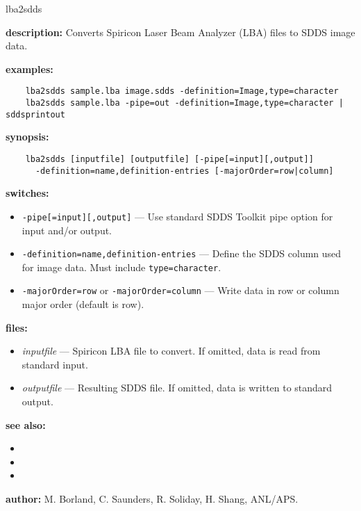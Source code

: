 \begin{sddsprog}{lba2sdds}
  \item \textbf{description:} Converts Spiricon Laser Beam Analyzer (LBA) files to SDDS image data.
  \item \textbf{examples:}
    \begin{verbatim}
    lba2sdds sample.lba image.sdds -definition=Image,type=character
    lba2sdds sample.lba -pipe=out -definition=Image,type=character | sddsprintout
    \end{verbatim}
  \item \textbf{synopsis:}
    \begin{verbatim}
    lba2sdds [inputfile] [outputfile] [-pipe[=input][,output]]
      -definition=name,definition-entries [-majorOrder=row|column]
    \end{verbatim}
  \item \textbf{switches:}
    \begin{itemize}
    \item \verb|-pipe[=input][,output]| --- Use standard SDDS Toolkit pipe option for input and/or output.
    \item \verb|-definition=name,definition-entries| --- Define the SDDS column used for image data. Must include \verb|type=character|.
    \item \verb|-majorOrder=row| or \verb|-majorOrder=column| --- Write data in row or column major order (default is row).
    \end{itemize}
  \item \textbf{files:}
    \begin{itemize}
    \item \emph{inputfile} --- Spiricon LBA file to convert. If omitted, data is read from standard input.
    \item \emph{outputfile} --- Resulting SDDS file. If omitted, data is written to standard output.
    \end{itemize}
  \item \textbf{see also:}
    \begin{itemize}
    \item {}
    \item {}
    \item {}
    \end{itemize}
  \item \textbf{author:} M. Borland, C. Saunders, R. Soliday, H. Shang, ANL/APS.
\end{sddsprog}
